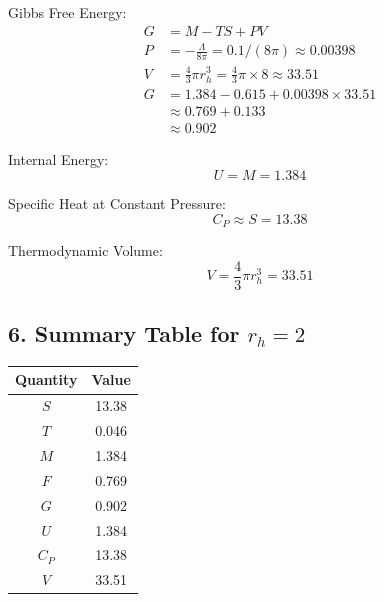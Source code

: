 \documentclass[12pt]{article}
\begin{document}
Gibbs Free Energy:
\begin{align*}
G &= M - T S + P V \\
P &= -\frac{\Lambda}{8\pi} = 0.1/(8\pi) \approx 0.00398 \\
V &= \frac{4}{3}\pi r_h^3 = \frac{4}{3}\pi \times 8 \approx 33.51 \\
G &= 1.384 - 0.615 + 0.00398 \times 33.51 \\
  &\approx 0.769 + 0.133 \\
  &\approx 0.902
\end{align*}

Internal Energy:
\begin{equation}
U = M = 1.384
\end{equation}

Specific Heat at Constant Pressure:
\begin{equation}
C_P \approx S = 13.38
\end{equation}

Thermodynamic Volume:
\begin{equation}
V = \frac{4}{3}\pi r_h^3 = 33.51
\end{equation}

\subsection*{6. Summary Table for $r_h = 2$}
\begin{center}
\begin{tabular}{|c|c|}
\hline
Quantity & Value \\
\hline
$S$ & 13.38 \\
$T$ & 0.046 \\
$M$ & 1.384 \\
$F$ & 0.769 \\
$G$ & 0.902 \\
$U$ & 1.384 \\
$C_P$ & 13.38 \\
$V$ & 33.51 \\
\hline
\end{tabular}
\end{center}
\end{document}
